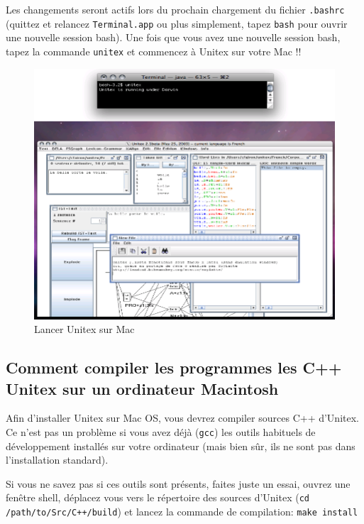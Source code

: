 \noindent Les changements seront actifs lors du prochain chargement du fichier \verb+.bashrc+ 
(quittez et relancez \verb+Terminal.app+ ou plus simplement, tapez \verb+bash+ pour ouvrir une
	nouvelle session bash). Une fois que vous avez une nouvelle session bash, tapez la commande 
\verb+unitex+ et commencez à Unitex sur votre Mac !!

\begin{figure}[!h]
\begin{center}
\includegraphics[width=13cm]{resources/img/fig-mac2.png}
\caption{Lancer Unitex sur Mac\label{fig-mac2}}
\end{center}
\end{figure}

\subsection{Comment compiler les programmes les C++ Unitex sur un ordinateur Macintosh}
\label{section-mac-compilation}
\noindent Afin d'installer Unitex sur Mac OS, vous devrez compiler sources C++ d'Unitex. Ce n'est
pas un problème si vous avez déjà (\verb+gcc+) les outils habituels de développement installés sur
votre ordinateur (mais bien sûr, ils ne sont pas dans l'installation standard).

\bigskip
\noindent Si vous ne savez pas si ces outils sont présents, faites juste un essai, ouvrez une
fenêtre shell, déplacez vous vers le répertoire des sources d'Unitex (\verb$cd /path/to/Src/C++/build$) et lancez la commande de compilation: \verb+make install+


